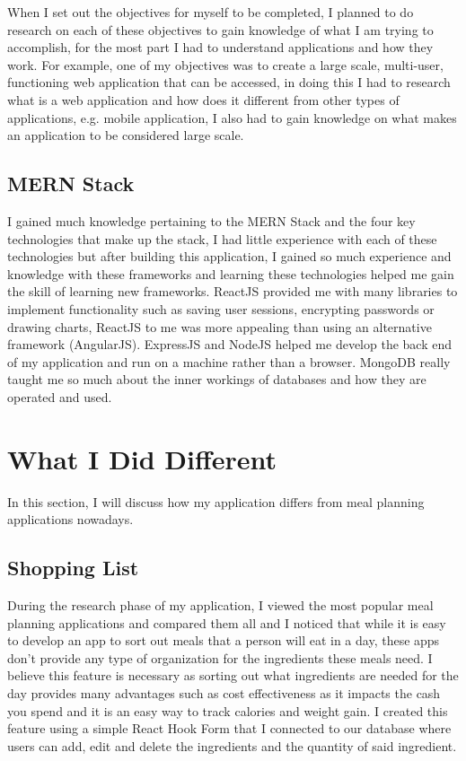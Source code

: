 When I set out the objectives for myself to be completed, I planned to do research on each of these objectives to gain knowledge of what I am trying to accomplish, for the most part I had to understand applications and how they work. For example, one of my objectives was to create a large scale, multi-user, functioning web application that can be accessed, in doing this I had to research what is a web application and how does it different from other types of applications, e.g. mobile application, I also had to gain knowledge on what makes an application to be considered large scale.

\subsection{MERN Stack}

I gained much knowledge pertaining to the MERN Stack and the four key technologies that make up the stack, I had little experience with each of these technologies but after building this application, I gained so much experience and knowledge with these frameworks and learning these technologies helped me gain the skill of learning new frameworks. ReactJS provided me with many libraries to implement functionality such as saving user sessions, encrypting passwords or drawing charts, ReactJS to me was more appealing than using an alternative framework (AngularJS). ExpressJS and NodeJS helped me develop the back end of my application and run on a machine rather than a browser. MongoDB really taught me so much about the inner workings of databases and how they are operated and used.

\section{What I Did Different}

In this section, I will discuss how my application differs from meal planning applications nowadays.

\subsection{Shopping List}

During the research phase of my application, I viewed the most popular meal planning applications and compared them all and I noticed that while it is easy to develop an app to sort out meals that a person will eat in a day, these apps don't provide any type of organization for the ingredients these meals need. I believe this feature is necessary as sorting out what ingredients are needed for the day provides many advantages such as cost effectiveness as it impacts the cash you spend and it is an easy way to track calories and weight gain. I created this feature using a simple React Hook Form that I connected to our database where users can add, edit and delete the ingredients and the quantity of said ingredient.

